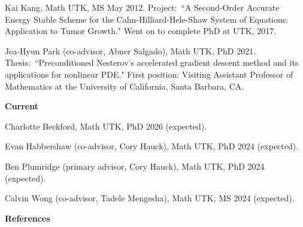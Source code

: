 \documentclass[11pt]{letter}
\begin{document}
\begin{description}
\begin{description}
	\item
Kai Kang, Math UTK, MS May 2012.  Project:~``A Second-Order Accurate Energy Stable Scheme for the Cahn-Hilliard-Hele-Shaw System of Equations: Application to Tumor Growth." Went on to complete PhD at UTK, 2017.

	\item
Jea-Hyun Park (co-advisor, Abner Salgado), Math UTK, PhD 2021.  Thesis:~``Preconditioned Nesterov's accelerated gradient descent method and its applications for nonlinear PDE." First position: Visiting Assistant Professor of Mathematics at the University of California, Santa Barbara, CA.
	\end{description}
	\item
{\Large\bf Current}
	\begin{description}	
	\item
Charlotte Beckford, Math UTK, PhD 2026 (expected).
	\item
Evan Habbershaw (co-advisor, Cory Hauck), Math UTK, PhD 2024 (expected).
	\item
Ben Plumridge (primary advisor, Cory Hauck), Math UTK, PhD 2024 (expected).
	\item
Calvin Wong (co-advisor, Tadele Mengesha), Math UTK, MS 2024 (expected).
	\end{description}

	\end{description}

	\clearpage
	\newpage

{\LARGE\bf  References}
	
\end{document}

